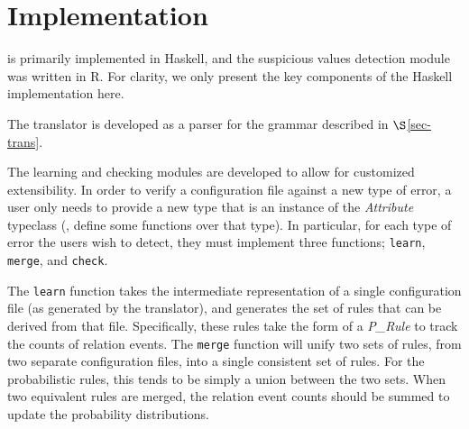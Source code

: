 \section{Implementation}

\app is primarily implemented in Haskell, and the suspicious values
detection module was written in R. 
For clarity,
we only present the key components of the Haskell implementation here.

The translator is developed as a parser for the grammar
described in $\S$\ref{sec-trans}. 

The learning and checking modules are developed to allow
for customized extensibility. In order to verify a configuration file
against a new type of error, a user only needs to provide a new type
that is an instance of the \textit{Attribute} typeclass (\ie, define some
functions over that type). 
In particular, for each type of error the users
wish to detect, they must implement three functions;
\lstinline{learn}, \lstinline{merge}, and \lstinline{check}.


The \lstinline{learn} function takes the intermediate representation of 
a single configuration file (as generated by the translator), 
and generates the set of rules that can be derived from that file.
Specifically, these rules take the form of 
a \textit{P\_Rule} to track the counts of relation events.
The \lstinline{merge} function will unify two sets of rules, from two separate configuration files, into a single consistent set of rules. 
For the probabilistic rules, this tends to be simply a union between the two sets. 
When two equivalent rules are merged, the relation event counts should be summed to update the probability distributions.

